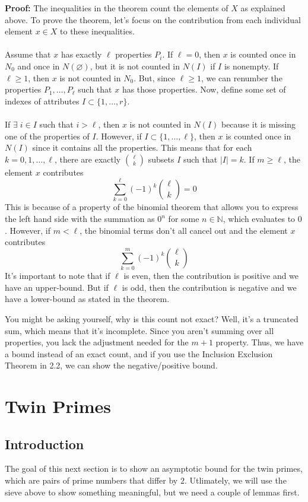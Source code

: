 \begin{boxedsection}
\textbf{Proof:} The inequalities in the theorem count the elements of $X$ as explained above. To prove the theorem, let's focus on the contribution from each individual element $x \in X$ to these inequalities.\\
\\
Assume that $x$ has exactly $\ell$ properties $P_i$. If $\ell = 0$, then $x$ is counted once in $N_0$ and once in $N(\varnothing)$, but it is not counted in $N(I)$ if $I$ is nonempty.  If $\ell \geq 1$, then $x$ is not counted in $N_0$. But, since $\ell \geq 1$, we can renumber the properties $P_1, \dots, P_\ell$ such that $x$ has those properties. Now, define some set of indexes of attributes $I \subset \{1,\dots,r\}$.\\
\\
If $\exists \; i \in I$ such that $i > \ell$, then $x$ is not counted in $N(I)$ because it is missing one of the properties of $I$. However, if $I \subset \{1,\dots,\ell\}$, then $x$ is counted once in $N(I)$ since it contains all the properties. This means that for each $k = 0,1,\dots,\ell$, there are exactly ${\ell \choose k}$ subsets $I$ such that $|I| = k$. If $m \geq \ell$, the element $x$ contributes 
$$
\sum_{k=0}^\ell (-1)^k {\ell \choose k} = 0
$$
This is because of a property of the binomial theorem that allows you to express the left hand side with the summation as $0^n$ for some $n \in \mathbb{N}$, which evaluates to $0$. However, if $m < \ell$, the binomial terms don't all cancel out and the element $x$ contributes
$$
\sum_{k=0}^m (-1)^k {\ell \choose k}
$$
It's important to note that if $\ell$ is even, then the contribution is positive and we have an upper-bound. But if $\ell$ is odd, then the contribution is negative and we have a lower-bound as stated in the theorem.
\end{boxedsection}
You might be asking yourself, why is this count not exact? Well, it's a truncated sum, which means that it's incomplete. Since you aren't summing over all properties, you lack the adjustment needed for the $m+1$ property. Thus, we have a bound instead of an exact count, and if you use the Inclusion Exclusion Theorem in 2.2, we can show the negative/positive bound.
\section{Twin Primes}
\subsection{Introduction}
The goal of this next section is to show an asymptotic bound for the twin primes, which are pairs of prime numbers that differ by $2$. Utlimately, we will use the sieve above to show something meaningful, but we need a couple of lemmas first.
